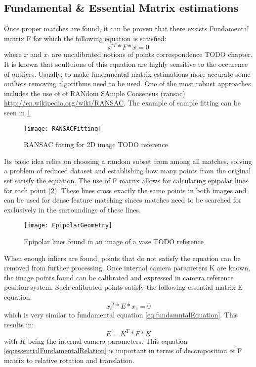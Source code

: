\subsection{Fundamental \& Essential Matrix estimations}
Once proper matches are found, it can be proven that there exsists Fundamental matrix F for which the following equation is satisfied:
\begin{equation} \label{eq:fundamntalEquation}
{x}^{'T} * F * x = 0
\end{equation} 
where $x$ and ${x}_{'}$ are uncalibrated notions of points correspondence \cite{HartletMultipleView}TODO chapter. It is known that soultuions of this equation are highly sensitive to the occurence of outliers. Usually, to make fundamental matrix estimations more accurate some outliers removing algorithms need to be used. One of the most robust approaches includes the use of of RANdom SAmple Consensus (\gls{ransac}) \url{http://en.wikipedia.org/wiki/RANSAC}. The example of sample fitting can be seen in \ref{fig:RANSACFitting}
\begin{figure}[p]
    \centering
    \texttt{[image: RANSACFitting]}
    \caption{RANSAC fitting for 2D image TODO reference}
    \label{fig:RANSACFitting}
\end{figure}
Its basic idea relies on choosing a random subset from among all matches, solving a problem of reduced dataset and establishing how many points from the original set satisfy the equation.
The use of F matrix allows for calculating epipolar lines for each point (\ref{fig:EpipolarGeometry}). These lines cross exactly the same points in both images and can be used for dense feature matching sinces matches need to be searched for exclusively in the surroundings of these lines.
\begin{figure}[p]
    \centering
    \texttt{[image: EpipolarGeometry]}
    \caption{Epipolar lines found in an image of a vase TODO reference}
    \label{fig:EpipolarGeometry}
\end{figure}
When enough inliers are found, points that do not satisfy the equation can be removed from further processing.
Once internal camera parameters K are known, the image points found can be calibrated and expressed in camera reference position system. Such calibrated points satisfy the following essential matrix E equation:
\begin{equation} \label{eq:essentialEquation}
{x}_{c}^{'T} * E * x_{c} = 0
\end{equation} 
which is very similar to fundamental equation \ref{eq:fundamntalEquation}. This results in:
\begin{equation} \label{eq:essentialFundamentalRelation}
E = K^{T} * F * K
\end{equation} 
with $K$ being the internal camera parameters. This equation \ref{eq:essentialFundamentalRelation} is important in terms of decomposition of F matrix to relative rotation and translation.
